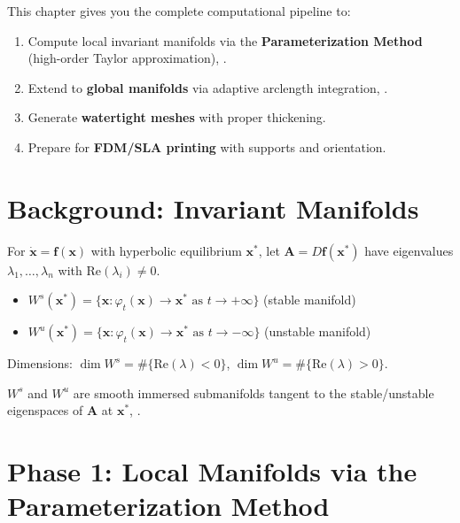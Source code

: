This chapter gives you the complete computational pipeline to:
\begin{enumerate}
    \item Compute local invariant manifolds via the \textbf{Parameterization Method} (high-order Taylor approximation), \cite{cabre2003parameterization}.
    \item Extend to \textbf{global manifolds} via adaptive arclength integration, \cite{cabre2003parameterization}.
    \item Generate \textbf{watertight meshes} with proper thickening.
    \item Prepare for \textbf{FDM/SLA printing} with supports and orientation.
\end{enumerate}

\section{Background: Invariant Manifolds}
\label{sec:3dp:background}

\begin{definition}
For $\dot{\bm{x}} = \bm{f}(\bm{x})$ with hyperbolic equilibrium $\bm{x}^*$, let $\bm{A} = D\bm{f}(\bm{x}^*)$ have eigenvalues $\lambda_1,\dots,\lambda_n$ with $\mathrm{Re}(\lambda_i) \neq 0$.
\begin{itemize}
    \item $W^s(\bm{x}^*) = \{\bm{x} : \varphi_t(\bm{x}) \to \bm{x}^* \text{ as } t \to +\infty\}$ (stable manifold) \cite{cabre2003parameterization}
    \item $W^u(\bm{x}^*) = \{\bm{x} : \varphi_t(\bm{x}) \to \bm{x}^* \text{ as } t \to -\infty\}$ (unstable manifold) \cite{cabre2003parameterization}
\end{itemize}
Dimensions: $\dim W^s = \#\{\mathrm{Re}(\lambda) < 0\}$, $\dim W^u = \#\{\mathrm{Re}(\lambda) > 0\}$.
\end{definition}

\begin{theorem}
$W^s$ and $W^u$ are smooth immersed submanifolds tangent to the stable/unstable eigenspaces of $\bm{A}$ at $\bm{x}^*$, \cite{cabre2003parameterization}.
\end{theorem}

\section{Phase 1: Local Manifolds via the Parameterization Method}
\label{sec:3dp:parameterization}

